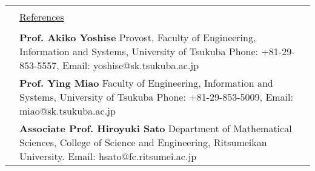\documentclass[a4paper,10pt]{article}
\newcommand{\headingfont}{\LARGE \MakeUppercase }
\newenvironment{SectionTable}[1]{
	\renewcommand*{\arraystretch}{1.0}
	\setlength{\tabcolsep}{10pt}
	\begin{longtable}{Rp{5.2in}} 
		\rule{2.3cm}{4pt} 
		& \underline{#1} \\ %
	}
	{
	\end{longtable}\vspace{-.3cm}
}
\begin{document}
\begin{SectionTable}{\headingfont References}
	&
	\textbf{Prof. Akiko Yoshise} \newline
	Provost, Faculty of Engineering, Information and Systems, University of Tsukuba \newline 
	Phone: +81-29-853-5557, Email: yoshise@sk.tsukuba.ac.jp \\
	
	
	& 
	\textbf{Prof. Ying Miao} \newline
	Faculty of Engineering, Information and Systems, University of Tsukuba \newline 
	Phone: +81-29-853-5009, Email: miao@sk.tsukuba.ac.jp\\
	

	& 
	\textbf{Associate Prof. Hiroyuki Sato} \newline
	Department of Mathematical Sciences, College of Science and Engineering, Ritsumeikan University. \newline
	Email: hsato@fc.ritsumei.ac.jp\\
\end{SectionTable}
	

\label{LastPage}  %
\end{document}
